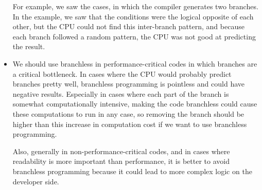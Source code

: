 \documentclass[12pt]{article}
\begin{document}
\begin{itemize}
	For example, we saw the  cases, in which the compiler generates two branches. In the example, we saw that the conditions were the logical opposite of each other, but the CPU could not find this inter-branch pattern, and because each branch followed a random pattern, the CPU was not good at predicting the result.
	
	
	\item 
	We should use branchless in performance-critical codes in which branches are a critical bottleneck. In cases where the CPU would probably predict branches pretty well, branchless programming is pointless and could have negative results. Especially in cases where each part of the branch is somewhat computationally intensive, making the code branchless could cause these computations to run in any case, so removing the branch should be higher than this increase in computation cost if we want to use branchless programming.
	
	Also, generally in non-performance-critical codes, and in cases where readability is more important than performance, it is better to avoid branchless programming because it could lead to more complex logic on the developer side.
	
	
	
	
	\end{itemize}
	
	
	
	\newpage
	
\end{document}

